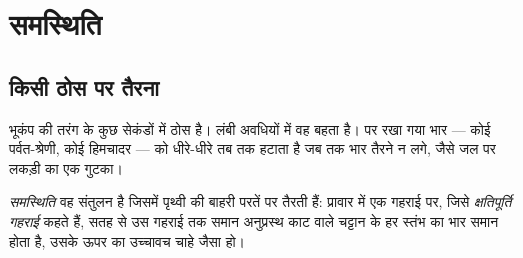 \section{समस्थिति}

\subsection{किसी ठोस पर तैरना}

भूकंप की तरंग के कुछ सेकंडों में  ठोस है। लंबी
अवधियों में वह बहता है।  पर रखा गया भार --- कोई पर्वत-श्रेणी,
कोई हिमचादर ---  को धीरे-धीरे तब तक हटाता है जब तक भार
तैरने न लगे, जैसे जल पर लकड़ी का एक गुटका।

\begin{definition}\label{def:g11:lithosphere-asthenosphere:isostasy}
\emph{समस्थिति} वह संतुलन है जिसमें पृथ्वी की बाहरी
परतें  पर तैरती हैं: प्रावार में एक गहराई पर, जिसे
\emph{क्षतिपूर्ति गहराई} कहते हैं, सतह से उस गहराई तक
समान अनुप्रस्थ काट वाले चट्टान के हर स्तंभ का भार समान होता है,
उसके ऊपर का उच्चावच चाहे जैसा हो।
\end{definition}

